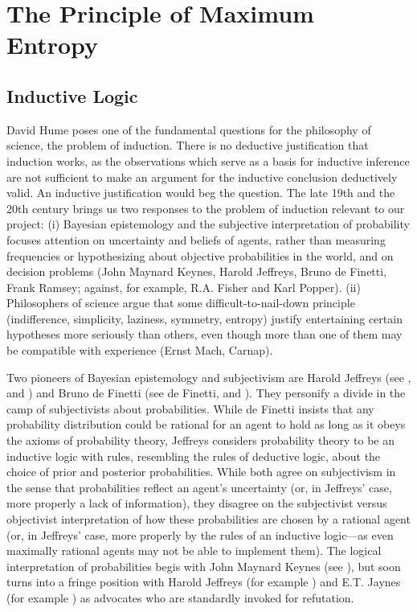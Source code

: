 \documentclass[phd,12pt,oneside]{ubcthesis}
\begin{document}
\chapter{The Principle of Maximum Entropy}
\label{chp:ohjafaex}

\section{Inductive Logic}
\label{sec:kishooyi}

David Hume poses one of the fundamental questions for the philosophy
of science, the problem of induction. There is no deductive
justification that induction works, as the observations which serve as
a basis for inductive inference are not sufficient to make an argument
for the inductive conclusion deductively valid. An inductive
justification would beg the question. The late 19th and the 20th
century brings us two responses to the problem of induction relevant
to our project: (i) Bayesian epistemology and the subjective
interpretation of probability focuses attention on uncertainty and
beliefs of agents, rather than measuring frequencies or hypothesizing
about objective probabilities in the world, and on decision problems
(John Maynard Keynes, Harold Jeffreys, Bruno de Finetti, Frank Ramsey;
against, for example, R.A. Fisher and Karl Popper). (ii) Philosophers
of science argue that some difficult-to-nail-down principle
(indifference, simplicity, laziness, symmetry, entropy) justify
entertaining certain hypotheses more seriously than others, even
though more than one of them may be compatible with experience (Ernst
Mach, Carnap).

Two pioneers of Bayesian epistemology and subjectivism are Harold
Jeffreys (see , and )
and Bruno de Finetti (see de Finetti,  and
). They personify a divide in the camp of
subjectivists about probabilities. While de Finetti insists that any
probability distribution could be rational for an agent to hold as
long as it obeys the axioms of probability theory, Jeffreys considers
probability theory to be an inductive logic with rules, resembling the
rules of deductive logic, about the choice of prior and posterior
probabilities. While both agree on subjectivism in the sense that
probabilities reflect an agent's uncertainty (or, in Jeffreys' case,
more properly a lack of information), they disagree on the
subjectivist versus objectivist interpretation of how these
probabilities are chosen by a rational agent (or, in Jeffreys' case,
more properly by the rules of an inductive logic---as even maximally
rational agents may not be able to implement them). The logical
interpretation of probabilities begis with John Maynard Keynes (see
), but soon turns into a fringe position with
Harold Jeffreys (for example ) and E.T. Jaynes
(for example ) as advocates who are
standardly invoked for refutation.
\end{document}
